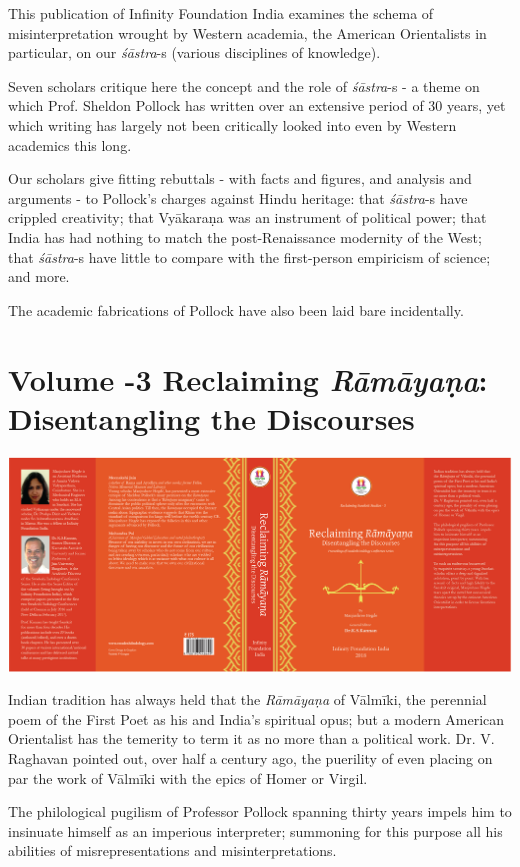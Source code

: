 This publication of Infinity Foundation India examines the schema of misinterpretation wrought by Western academia, the American Orientalists in particular, on our \textit{śāstra}-s (various disciplines of knowledge).

Seven scholars critique here the concept and the role of \textit{śāstra}-s - a theme on which Prof. Sheldon Pollock has written over an extensive period of 30 years, yet which writing has largely not been critically looked into even by Western academics this long.

Our scholars give fitting rebuttals - with facts and figures, and analysis and arguments - to Pollock's charges against Hindu heritage: that \textit{śāstra}-s have crippled creativity; that Vyākaraṇa was an instrument of political power; that India has had nothing to match the post-Renaissance modernity of the West; that \textit{śāstra}-s have little to compare with the first-person empiricism of science; and more.

The academic fabrications of Pollock have also been laid bare incidentally.


\section*{\num{Volume -3} Reclaiming \textit{Rāmāyaṇa}: Disentangling the Discourses}

\includegraphics{images/fig03.png}

Indian tradition has always held that the \textit{Rāmāyaṇa} of Vālmīki, the perennial poem of the First Poet as his and India’s spiritual opus; but a modern American Orientalist has the temerity to term it as no more than a political work. Dr. V. Raghavan pointed out, over half a century ago, the puerility of even placing on par the work of Vālmīki with the epics of Homer or Virgil.

The philological pugilism of Professor Pollock spanning thirty years impels him to insinuate himself as an imperious interpreter; summoning for this purpose all his abilities of misrepresentations and misinterpretations.

